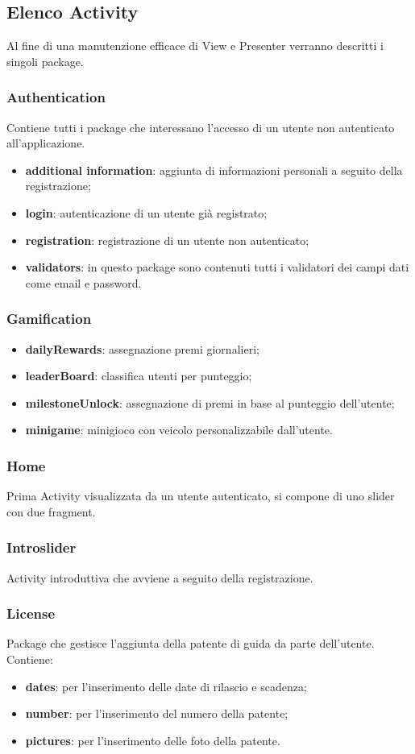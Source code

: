 \newpage

\subsection{Elenco Activity}
Al fine di una manutenzione efficace di View e Presenter verranno descritti i singoli package.

\subsubsection{Authentication}
Contiene tutti i package che interessano l'accesso di un utente non autenticato all'applicazione.
\begin{itemize}
	\item \textbf{additional information}: aggiunta di informazioni personali a seguito della registrazione;
	\item \textbf{login}: autenticazione di un utente già registrato;
	\item \textbf{registration}: registrazione di un utente non autenticato;
	\item \textbf{validators}: in questo package sono contenuti tutti i validatori dei campi dati come email e password.	
\end{itemize}
\subsubsection{Gamification}
\begin{itemize}
	\item \textbf{dailyRewards}: assegnazione premi giornalieri;
	\item \textbf{leaderBoard}: classifica utenti per punteggio;
	\item \textbf{milestoneUnlock}: assegnazione di premi in base al punteggio dell'utente;
	\item \textbf{minigame}: minigioco con veicolo personalizzabile dall'utente.
\end{itemize}
\subsubsection{Home}
Prima Activity visualizzata da un utente autenticato, si compone di uno slider con due fragment\glo.
\subsubsection{Introslider}
Activity introduttiva che avviene a seguito della registrazione.
\subsubsection{License}
Package che gestisce l'aggiunta della patente di guida da parte dell'utente.
Contiene:
\begin{itemize}
	\item \textbf{dates}: per l'inserimento delle date di rilascio e scadenza;
	\item \textbf{number}: per l'inserimento del numero della patente;
	\item \textbf{pictures}: per l'inserimento delle foto della patente.
\end{itemize}
